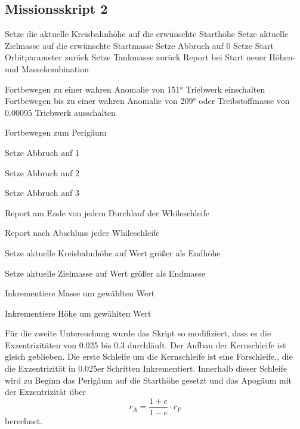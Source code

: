 
\subsection{Missionsskript 2}

\begin{algorithmic}

\STATE Setze die aktuelle Kreisbahnhöhe auf die erwünschte Starthöhe
\STATE Setze aktuelle Zielmasse auf die erwünschte Startmasse
\STATE Setze Abbruch auf 0
\STATE Setze Start Orbitparameter zurück
\STATE Setze Tankmasse zurück
\RETURN Report bei Start neuer Höhen- und Massekombination


\STATE Fortbewegen zu einer wahren Anomalie von 151°
\STATE Triebwerk einschalten
\STATE Fortbewegen bis zu einer wahren Anomalie von 209° oder Treibstoffmasse von 0.00095 
\STATE Triebwerk ausschalten
\ENDIF

\STATE Fortbewegen zum Perigäum
\ENDIF

\STATE Setze Abbruch auf 1
\ENDIF

\STATE Setze Abbruch auf 2
\ENDIF

\STATE Setze Abbruch auf 3
\ENDIF

\RETURN Report am Ende von jedem Durchlauf der Whileschleife
\ENDWHILE

\RETURN Report nach Abschluss jeder Whileschleife


\STATE Setze aktuelle Kreisbahnhöhe auf Wert größer als Endhöhe 
\ENDIF

\STATE Setze aktuelle Zielmasse auf Wert größer als Endmasse
\ENDIF

\STATE Inkrementiere Masse um gewählten Wert
\ENDWHILE

\STATE Inkrementiere Höhe um gewählten Wert
\ENDWHILE

\end{algorithmic}

	Für die zweite Untersuchung wurde das Skript so modifiziert, dass es die Exzentrizitäten von \num{0.025} bis \num{0.3} durchläuft.
Der Aufbau der Kernschleife ist gleich geblieben. Die erste Schleife um die Kernschleife ist eine Forschleife,, die die Exzentrizität in \num{0.025}er Schritten Inkrementiert. Innerhalb dieser Schleife wird zu Beginn das Perigäum auf die Starthöhe gesetzt und das Apogäum mit der Exzentrizität über
\begin{equation}
r_A = \frac{1+e}{1-e}\cdot r_P
\label{apoapsis}
\end{equation}
berechnet.\\


